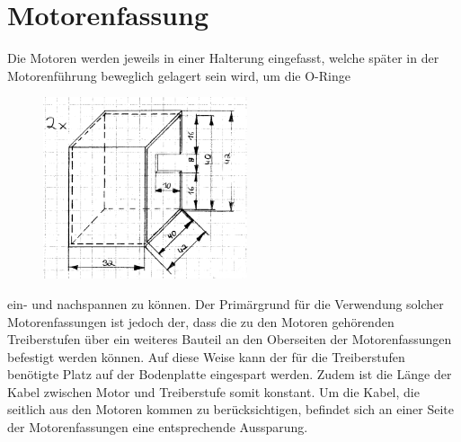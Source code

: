 \section{Motorenfassung}
Die Motoren werden jeweils in einer Halterung eingefasst, welche später in der Motorenführung beweglich gelagert sein wird, um die O-Ringe 
\begin{figure}
	\includegraphics[width=6cm,angle=0]{content/pictures/motorenfassung.png}
\end{figure}
ein- und nachspannen zu können. Der Primärgrund für die Verwendung solcher Motorenfassungen ist jedoch der, dass die zu den Motoren gehörenden Treiberstufen über ein weiteres Bauteil an den Oberseiten der Motorenfassungen befestigt werden können. Auf diese Weise kann der für die Treiberstufen benötigte Platz auf der Bodenplatte eingespart werden. Zudem ist die Länge der Kabel zwischen Motor und Treiberstufe somit konstant. Um die Kabel, die seitlich aus den Motoren kommen zu berücksichtigen, befindet sich an einer Seite der Motorenfassungen eine entsprechende Aussparung.

